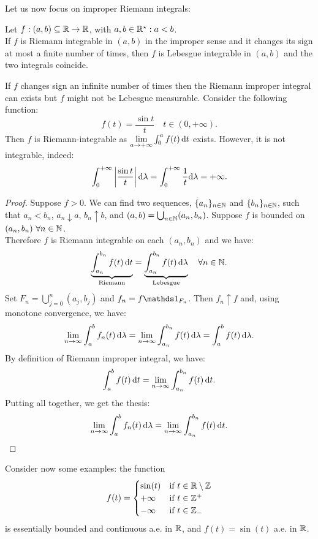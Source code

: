Let us now focus on improper Riemann integrals:
\begin{theo}
	Let $f: (a,b) \subseteq \mathbb R \to \mathbb R$, with $a,b\in \mathbb R^\star : a< b$.\\
	If $f$ is Riemann integrable in $(a,b)$ in the improper sense and it changes its sign at most a finite number of times, then $f$ is Lebesgue integrable in $(a,b)$ and the two integrals coincide.
\end{theo}

If $f$ changes sign an infinite number of times then the Riemann improper integral can exists but $f$ might not be Lebesgue measurable. Consider the following function:
$$f(t)
=\frac {\sin t}{t}
\quad t \in (0,+\infty).$$
Then $f$ is Riemann-integrable as $\lim\limits_{a \to +\infty} \int_0^a f(t) \,\mathrm d t$ exists. However, it is not integrable, indeed:
$$ \int_0^{+\infty} \left| \frac{ \sin t}{t} \right| \mathrm d \lambda 
= \int_0^{+\infty}\frac 1 t \mathrm d \lambda
= +\infty.$$
	
\begin{proof}
	Suppose $f>0$. We can find two sequences, $\{a_n\}_{n\in \mathbb N}$ and $\{b_n\}_{n\in \mathbb N}$, such that $a_n < b_n$, $a_n \downarrow a$, $b_n \uparrow b$, and $(a,b)=\bigcup_{n\in \mathbb N} (a_n,b_n)$. Suppose $f$ is bounded on $(a_n,b_n) \ \forall n \in \mathbb N$.\\
	Therefore $f$ is Riemann integrable on each $(a_n,b_n)$ and we have:
	$$\underbrace{\int_{a_n}^{b_n} f(t) \,\mathrm d t}_{\text{Riemann}}
	= \underbrace{\int_{a_n}^{b_n} f(t) \,\mathrm d \lambda}_{\text{Lebesgue}}
	\quad \forall n \in \mathbb N.
	$$
	Set $F_n = \bigcup_{j=0}^n (a_j,b_j)$ and $f_n = f \Ind_{F_n}$. Then $f_n \uparrow f$ and, using monotone convergence, we have:
	$$\lim_{n \to \infty} \int_a^b f_n(t) \,\mathrm d \lambda
	= \lim_{n \to \infty} \int_{a_n}^{b_n} f(t) \,\mathrm d \lambda
	= \int_a^b f(t) \,\mathrm d \lambda.
	$$
	By definition of Riemann improper integral, we have:
	$$\int_a^b f(t) \,\mathrm d t
	= \lim_{n \to \infty} \int_{a_n}^{b_n} f(t) \,\mathrm d t.
	$$
	Putting all together, we get the thesis:
	$$\lim_{n \to \infty} \int_a^b f_n(t) \,\mathrm d \lambda 
	= \lim_{n \to \infty} \int_{a_n}^{b_n} f(t) \,\mathrm d t.
	$$
\end{proof}

Consider now some examples: the function
$$f(t)=\begin{cases}
	\sin(t) & \text{if } t \in \mathbb R \setminus \mathbb Z \\ 
	+ \infty & \text{if } t \in \mathbb Z^+ \\ 
	- \infty & \text{if } t \in \mathbb Z_-	
	\end{cases} $$
 is essentially bounded and continuous a.e. in $\mathbb R$, and $f(t) = \sin(t)$ a.e. in $\mathbb R$.

